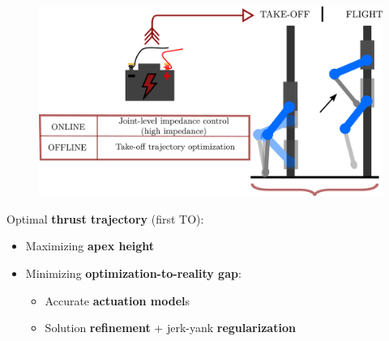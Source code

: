\documentclass[aspectratio=169]{beamer}
\begin{document}
\begin{frame}
\frametitle{\Large}
\begin{multicols}{2}
\vfill\null
\begin{figure}
    \centering
    \includegraphics[width=1.0\columnwidth]{beamer_imgs/impact_opt_intro/first_TO.pdf}
\end{figure}
\columnbreak
Optimal \textbf{thrust trajectory} (first TO):
\begin{itemize}
\item {Maximizing \textbf{apex height}}\vspace{0.2cm}
\item {Minimizing \textbf{optimization-to-reality gap}:}
\begin{itemize}\vspace{0.2cm}
\item {Accurate \textbf{actuation model}s}
\item {Solution \textbf{refinement} + jerk-yank \textbf{regularization}}
\end{itemize}
\end{itemize}
\vfill\null
\end{multicols}
\end{frame}

\end{document}
